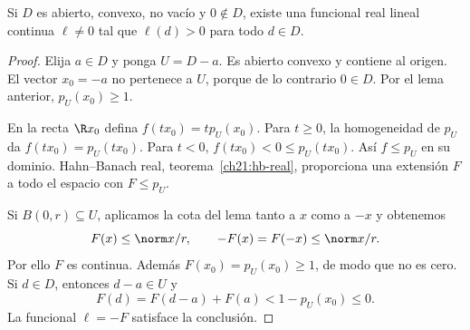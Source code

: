 \begin{lema}\label{ch24:separacion-abierto}
Si $D$ es abierto, convexo, no vacío y $0\notin D$, existe una funcional real lineal continua $\ell\ne0$ tal que $\ell(d)>0$ para todo $d\in D$.
\end{lema}
\begin{proof}
Elija $a\in D$ y ponga $U=D-a$. Es abierto convexo y contiene al origen. El vector $x_0=-a$ no pertenece a $U$, porque de lo contrario $0\in D$. Por el lema anterior, $p_U(x_0)\geq1$.

En la recta $\R x_0$ defina $f(tx_0)=t p_U(x_0)$. Para $t\geq0$, la homogeneidad de $p_U$ da $f(tx_0)=p_U(tx_0)$. Para $t<0$, $f(tx_0)<0\leq p_U(tx_0)$. Así $f\leq p_U$ en su dominio. Hahn--Banach real, teorema~\ref{ch21:hb-real}, proporciona una extensión $F$ a todo el espacio con $F\leq p_U$.

Si $B(0,r)\subseteq U$, aplicamos la cota del lema tanto a $x$ como a $-x$ y obtenemos
\[
 F(x)\leq\norm x/r,\qquad -F(x)=F(-x)\leq\norm x/r.
\]
Por ello $F$ es continua. Además $F(x_0)=p_U(x_0)\geq1$, de modo que no es cero. Si $d\in D$, entonces $d-a\in U$ y
\[
 F(d)=F(d-a)+F(a)<1-p_U(x_0)\leq0.
\]
La funcional $\ell=-F$ satisface la conclusión.
\end{proof}

